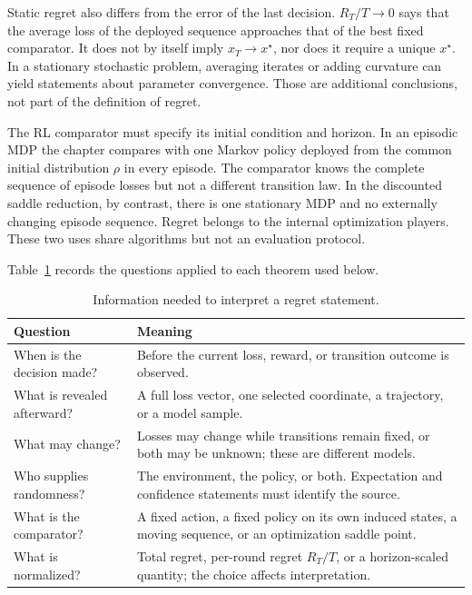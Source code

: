 Static regret also differs from the error of the last decision. $R_T/T\to0$ says that the average loss of the deployed sequence approaches that of the best fixed comparator. It does not by itself imply $x_T\to x^\star$, nor does it require a unique $x^\star$. In a stationary stochastic problem, averaging iterates or adding curvature can yield statements about parameter convergence. Those are additional conclusions, not part of the definition of regret.

The RL comparator must specify its initial condition and horizon. In an episodic MDP the chapter compares with one Markov policy deployed from the common initial distribution $\rho$ in every episode. The comparator knows the complete sequence of episode losses but not a different transition law. In the discounted saddle reduction, by contrast, there is one stationary MDP and no externally changing episode sequence. Regret belongs to the internal optimization players. These two uses share algorithms but not an evaluation protocol.

Table~\ref{tab:online_guarantee_reading} records the questions applied to each theorem used below.

\begin{table}[htbp]
\centering
\caption{Information needed to interpret a regret statement.}
\label{tab:online_guarantee_reading}
\small
\begin{tabular}{p{}p{}}
\toprule
Question & Meaning \\
\midrule
When is the decision made? & Before the current loss, reward, or transition outcome is observed. \\
What is revealed afterward? & A full loss vector, one selected coordinate, a trajectory, or a model sample. \\
What may change? & Losses may change while transitions remain fixed, or both may be unknown; these are different models. \\
Who supplies randomness? & The environment, the policy, or both. Expectation and confidence statements must identify the source. \\
What is the comparator? & A fixed action, a fixed policy on its own induced states, a moving sequence, or an optimization saddle point. \\
What is normalized? & Total regret, per-round regret $R_T/T$, or a horizon-scaled quantity; the choice affects interpretation. \\
\bottomrule
\end{tabular}
\end{table}

